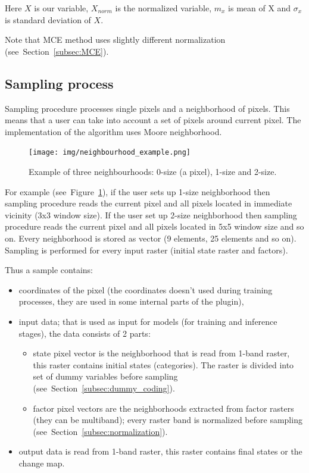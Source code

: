 \documentclass{report}
\begin{document}
Here $X$ is our variable, $X_{norm}$ is the normalized variable, $m_{x}$ is mean of X and $\sigma _{x}$ is standard deviation of $X$. 

Note that MCE method uses slightly different normalization (see~Section~\ref{subsec:MCE}).


\subsection{Sampling process}\label{subsec:sampling}

Sampling procedure processes single pixels and a neighborhood of pixels.
This means that a user can take into account a set of pixels around current pixel.
The implementation of the algorithm uses Moore neighborhood.

\begin{figure}[h!]
\centering
\texttt{[image: img/neighbourhood\_example.png]}
\caption{Example of three neighbourhoods: 0-size (a pixel), 1-size and 2-size.}
\label{fig:neighbourhood_example}
\end{figure}

For example (see~Figure~\ref{fig:neighbourhood_example}), if the user sets up 1-size neighborhood then sampling procedure reads the current pixel and all pixels located in immediate vicinity (3x3 window size). If the user set up 2-size neighborhood then sampling procedure reads the current pixel and all pixels located in 5x5 window size and so on. Every neighborhood is stored as vector (9 elements, 25 elements and so on). Sampling is performed for every input raster (initial state raster and factors).

Thus a sample contains:
\begin{itemize}
    \item coordinates of the pixel (the coordinates doesn't used during training processes, they are used in some internal parts of the plugin),
    \item input data; that is used as input for models (for training and inference stages), the data consists of 2 parts:
      \begin{itemize}
      \item state pixel vector is the neighborhood that is read from 1-band raster, this raster contains initial states (categories). The raster is divided into set of dummy variables before sampling (see~Section~\ref{subsec:dummy_coding}).
        \item factor pixel vectors are the neighborhoods extracted from factor rasters (they can be multiband); every raster band is normalized before sampling (see~Section~\ref{subsec:normalization}).
      \end{itemize}
    \item output data is read from 1-band raster, this raster contains final states or the change map.
\end{itemize}
\end{document}
